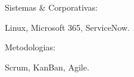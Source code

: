 \begin{cventries}
  \cventry
    {} %
    {Sistemas \& Corporativas:} %
    {} %
    {} %
    {
      \begin{cvitems} %
        \item {Linux, Microsoft 365, ServiceNow.}
      \end{cvitems}
    }

  \cventry
    {} %
    {Metodologias:} %
    {} %
    {} %
    {
      \begin{cvitems} %
        \item {Scrum, KanBan, Agile.}
      \end{cvitems}
    }

\end{cventries}
